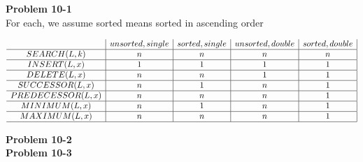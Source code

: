 \documentclass{article}
\begin{document}
\noindent\textbf{ Problem 10-1} \\

For each, we assume sorted means sorted in ascending order

$
\begin{array}{c|c|c|c|c|}
&unsorted,single& sorted,single&unsorted,double&sorted,double\\
\hline
SEARCH(L,k)&n&n&n&n\\
\hline
INSERT(L,x)&1&1&1&1\\
\hline
DELETE(L,x)&n&n&1&1\\
\hline
SUCCESSOR(L,x)&n&1&n&1\\
\hline
PREDECESSOR(L,x)&n&n&n&1\\
\hline
MINIMUM(L,x)&n&1&n&1\\
\hline
MAXIMUM(L,x)&n&n&n&1\\
\hline

\end{array}
$

\noindent\textbf{ Problem 10-2} \\


\noindent\textbf{ Problem 10-3} \\
\end{document}
